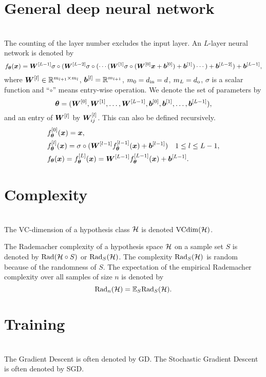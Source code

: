 \documentclass{article}
\begin{document}
\section{General deep neural network}~\\
The counting of the layer number excludes the input layer. An $L$-layer neural network is denoted by
\begin{equation}
    f_{\bm{\theta}}(\bm{x}) = \bm{W}^{[L-1]} \sigma\circ(\bm{W}^{[L-2]}\sigma\circ(\cdots (\bm{W}^{[1]} \sigma\circ(\bm{W}^{[0]} \bm{x} + \bm{b}^{[0]} ) + \bm{b}^{[1]} )\cdots)+\bm{b}^{[L-2]})+\bm{b}^{[L-1]},
\end{equation}
where $\bm{W}^{[l]} \in \mathbb{R}^{m_{l+1}\times m_{l}}$, $\bm{b}^{[l]}=\mathbb{R}^{m_{l+1}}$, $m_0=d_{\rm in}=d$, $m_{L}=d_{\rm o}$,
$\sigma$ is a scalar function and ``$\circ$'' means entry-wise operation. 
We denote the set of parameters by \[
\bm{\theta}=(\bm{W}^{[0]},\bm{W}^{[1]},\ldots,\bm{W}^{[L-1]},\bm{b}^{[0]},\bm{b}^{[1]},\ldots,\bm{b}^{[L-1]}),
\] 
and  an entry of $\bm{W}^{[l]}$ by   $\bm{W}^{[l]}_{ij}$. This can also be defined recursively.
\begin{align}
    &f_{\bm{\theta}}^{[0]}(\bm{x})=\bm{x}, \\
    &f_{\bm{\theta}}^{[l]}(\bm{x})=\sigma\circ(\bm{W}^{[l-1]} f_{\bm{\theta}}^{[l-1]}(\bm{x}) + \bm{b}^{[l-1]}) \quad 1\leq l\leq L-1,\\
    &f_{\bm{\theta}}(\bm{x})=f_{\bm{\theta}}^{[L]}(\bm{x})=\bm{W}^{[L-1]} f_{\bm{\theta}}^{[L-1]}(\bm{x}) + \bm{b}^{[L-1]}.
\end{align}

\section{Complexity}~\\
The VC-dimension of a hypothesis class $\mathcal{H}$ is denoted ${\rm VCdim}(\mathcal{H})$.

The Rademacher complexity of a hypothesis space $\mathcal{H}$ on a sample set $S$ is denoted by ${\rm Rad} (\mathcal{H}\circ S)$ or ${\rm Rad}_{S} (\mathcal{H})$. The complexity ${\rm Rad}_{S} (\mathcal{H})$ is random because of the randomness of $S$. The expectation of the empirical Rademacher complexity over all samples of size $n$ is denoted by 
\[
{\rm Rad}_{n} (\mathcal{H})=\mathbb{E}_{S} {\rm Rad}_{S} (\mathcal{H}).
\]

\section{Training}~\\
The Gradient Descent is often denoted by GD. The Stochastic Gradient Descent is often denoted by SGD. 
\end{document}
